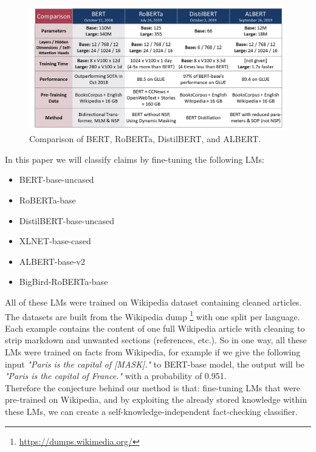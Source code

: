 \documentclass[conference]{IEEEtran}
\begin{document}
\begin{figure}[htp]
    \centering
    \includegraphics[scale=0.28]{lm_compar.png}
    \caption[Comparison]{Comparison of BERT, RoBERTa, DistilBERT, and ALBERT. \footnotemark}
    \label{fig:lm_compar}
\end{figure}

In this paper we will classify claims by fine-tuning the following LMs:

\begin{itemize}
\item BERT-base-uncased \cite{devlin2018bert}
\item RoBERTa-base \cite{liu2019roberta}
\item DistilBERT-base-uncased \cite{sanh2019distilbert}
\item XLNET-base-cased \cite{yang2019xlnet}
\item ALBERT-base-v2 \cite{lan2019albert}
\item BigBird-RoBERTa-base \cite{zaheer2020big}\\
\end{itemize}

All of these LMs were trained on Wikipedia dataset containing cleaned articles. The datasets are built from the Wikipedia dump \footnote{\url{https://dumps.wikimedia.org/}} with one split per language. Each example contains the content of one full Wikipedia article with cleaning to strip markdown and unwanted sections (references, etc.). So in one way, all these LMs were trained on facts from Wikipedia, for example if we give the following input \textit{"Paris is the capital of [MASK]."} to BERT-base model, the output will be \textit{"Paris is the capital of France."} with a probability of 0.951.\\
Therefore the conjecture behind our method is that: fine-tuning LMs that were pre-trained on Wikipedia, and by exploiting the already stored knowledge within these LMs, we can create a self-knowledge-independent fact-checking classifier.
\end{document}
